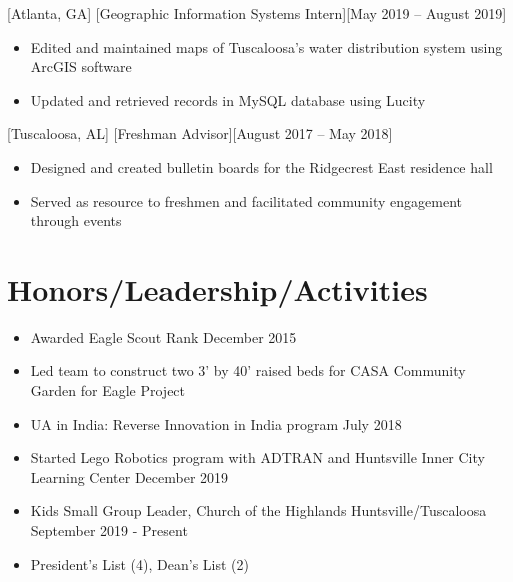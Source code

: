\documentclass[hidelinks, 11pt]{article}
\begin{document}
		[Atlanta, GA]
		[Geographic Information Systems Intern][May 2019 – August 2019]
		
			\begin{itemize}
				\item Edited and maintained maps of Tuscaloosa’s water distribution system using ArcGIS software
				\item Updated and retrieved records in MySQL database using Lucity
			\end{itemize}\leavevmode
		
		[Tuscaloosa, AL]
		[Freshman Advisor][August 2017 – May 2018]
		
			\begin{itemize}
				\item Designed and created bulletin boards for the Ridgecrest East residence hall
				\item Served as resource to freshmen and facilitated community engagement through events
			\end{itemize}\leavevmode
	
	\section{Honors/Leadership/Activities}
	
		\begin{itemize}
			\item Awarded Eagle Scout Rank \hfill December 2015
			\item Led team to construct two 3' by 40' raised beds for CASA Community Garden for Eagle Project
			\item UA in India: Reverse Innovation in India program \hfill July 2018
			\item Started Lego Robotics program with ADTRAN and Huntsville Inner City Learning Center \hfill December 2019
			\item Kids Small Group Leader, Church of the Highlands Huntsville/Tuscaloosa \hfill September 2019 - Present
			\item President's List (4), Dean's List (2)
		\end{itemize}
	 
\end{document}
